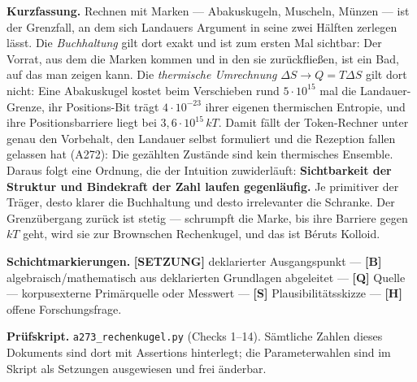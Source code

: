 
\providecommand{\qedsq}{\raisebox{0.03em}{\framebox[0.62em]{\rule{0pt}{0.42em}}}}
\begingroup\small\noindent
\textbf{Kurzfassung.} Rechnen mit Marken --- Abakuskugeln, Muscheln, Münzen ---
ist der Grenzfall, an dem sich Landauers Argument in seine zwei Hälften zerlegen
lässt. Die \emph{Buchhaltung} gilt dort exakt und ist zum ersten Mal sichtbar: Der
Vorrat, aus dem die Marken kommen und in den sie zurückfließen, ist ein Bad, auf
das man zeigen kann. Die \emph{thermische Umrechnung} $\Delta S \to Q = T\Delta S$
gilt dort nicht: Eine Abakuskugel kostet beim Verschieben rund $5\cdot10^{15}$ mal
die Landauer-Grenze, ihr Positions-Bit trägt $4\cdot10^{-23}$ ihrer eigenen
thermischen Entropie, und ihre Positionsbarriere liegt bei $3{,}6\cdot10^{15}\,kT$.
Damit fällt der Token-Rechner unter genau den Vorbehalt, den Landauer selbst
formuliert und die Rezeption fallen gelassen hat (A272): Die gezählten Zustände
sind kein thermisches Ensemble. Daraus folgt eine Ordnung, die der Intuition
zuwiderläuft: \textbf{Sichtbarkeit der Struktur und Bindekraft der Zahl laufen
gegenläufig.} Je primitiver der Träger, desto klarer die Buchhaltung und desto
irrelevanter die Schranke. Der Grenzübergang zurück ist stetig --- schrumpft die
Marke, bis ihre Barriere gegen $kT$ geht, wird sie zur Brownschen Rechenkugel, und
das ist Béruts Kolloid.
\par\endgroup

\bigskip

\begingroup\small\noindent
\textbf{Schichtmarkierungen.} \textbf{[SETZUNG]} deklarierter Ausgangspunkt ---
\textbf{[B]} algebraisch/mathematisch aus deklarierten Grundlagen abgeleitet ---
\textbf{[Q]} Quelle --- korpusexterne Primärquelle oder Messwert ---
\textbf{[S]} Plausibilitätsskizze ---
\textbf{[H]} offene Forschungsfrage.

\par\endgroup

\bigskip

\begingroup\small\noindent
\textbf{Prüfskript.} \texttt{a273\_rechenkugel.py} (Checks 1--14). Sämtliche
Zahlen dieses Dokuments sind dort mit Assertions hinterlegt; die
Parameterwahlen sind im Skript als Setzungen ausgewiesen und frei änderbar.
\par\endgroup

\bigskip

